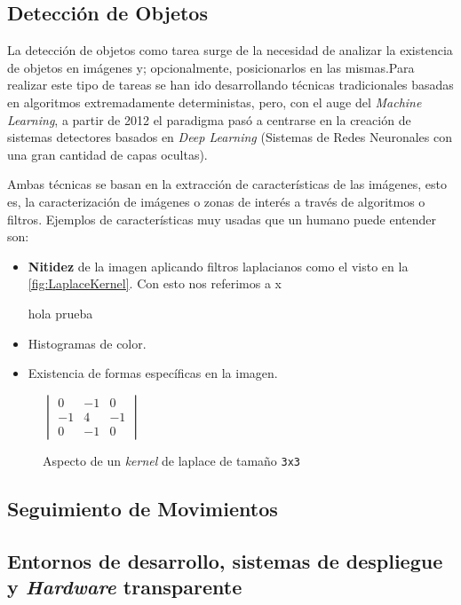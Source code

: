 \subsection{Detección de Objetos}

La detección de objetos como tarea surge de la necesidad de analizar la existencia de objetos en imágenes y; opcionalmente, posicionarlos en las mismas.Para realizar este tipo de tareas se han ido 
desarrollando técnicas tradicionales basadas en algoritmos extremadamente deterministas, pero, con el auge del \textit{Machine Learning}, a partir de 2012\cite{zouObjectDetection202023} 
el paradigma pasó a centrarse en la creación de sistemas detectores basados en \textit{Deep Learning} (Sistemas de Redes Neuronales con una gran cantidad de capas ocultas).

Ambas técnicas se basan en la extracción de características de las imágenes, esto es, la caracterización de imágenes o zonas de interés a través de algoritmos o filtros. Ejemplos de características 
muy usadas que un humano puede entender son:\begin{itemize}
    \item \textbf{Nitidez} de la imagen aplicando filtros laplacianos como el visto en la \autoref{fig:LaplaceKernel}.
    Con esto nos referimos a x

    hola prueba
    \item Histogramas de color.
    \item Existencia de formas específicas en la imagen.
\end{itemize}

\begin{figure}[H]
    \centering
    \(
    \begin{vmatrix}
        0 & -1 & 0 \\
        -1 & 4 & -1 \\
        0 & -1 & 0
    \end{vmatrix}
    \)
    \caption{Aspecto de un \textit{kernel} de laplace de tamaño \texttt{3x3}}
    \label{fig:LaplaceKernel}
\end{figure}


\subsection{Seguimiento de Movimientos}

\subsection{Entornos de desarrollo, sistemas de despliegue y \textit{Hardware} transparente}
